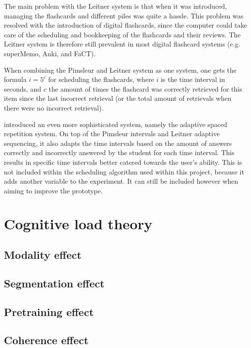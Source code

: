 The main problem with the Leitner system is that when it was introduced, managing the flashcards and different piles was quite a hassle. This problem was resolved with the introduction of digital flashcards, since the computer could take care of the scheduling and bookkeeping of the flashcards and their reviews. The Leitner system is therefore still prevalent in most digital flashcard systems (e.g. superMemo, Anki, and FaCT).

When combining the Pimsleur and Leitner system as one system, one gets the formula $i = 5^c$ for scheduling the flashcards, where $i$ is the time interval in seconds, and $c$ the amount of times the flashcard was correctly retrieved for this item since the last incorrect retrieval (or the total amount of retrievals when there were no incorrect retrieval).

 introduced an even more sophisticated system, namely the adaptive spaced repetition system. On top of the Pimsleur intervals and Leitner adaptive sequencing, it also adapts the time intervals based on the amount of answers correctly and incorrectly answered by the student for each time interval. This results in specific time intervals better catered towards the user's ability. This is not included within the scheduling algorithm used within this project, because it adds another variable to the experiment. It can still be included however when aiming to improve the prototype.

    \section{Cognitive load theory}

        \subsection{Modality effect}

        \subsection{Segmentation effect}

        \subsection{Pretraining effect}

        \subsection{Coherence effect}

